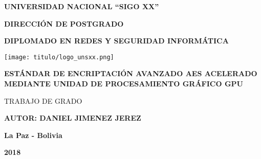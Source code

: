 \documentclass[../main.tex]{subfiles}
\begin{document}
  \thispagestyle{empty}
  \vspace*{-0.5cm}

  \begin{center}
    \LARGE\MakeUppercase{\textbf{Universidad Nacional ``Sigo XX''}}

    \vspace{0.5cm}
    \Large\MakeUppercase{\textbf{Dirección de Postgrado}}

    \vspace{0.5cm}
    \large\MakeUppercase{\textbf{Diplomado en Redes y Seguridad Informática}}

    \vspace{1.3cm}
    \texttt{[image: titulo/logo\_unsxx.png]}
    \vspace{1.3cm}

    \Large\MakeUppercase{\textbf{Estándar de Encriptación Avanzado AES acelerado mediante Unidad de Procesamiento Gráfico GPU}}

    \vspace{0.4cm}
    \large\MakeUppercase{Trabajo de Grado}

    \vspace{1cm}
    \large{\MakeUppercase{\textbf{Autor: Daniel Jimenez Jerez}}}
    \vspace{1cm}

    \large{\textbf{La Paz - Bolivia}}

    \large{\textbf{2018}}
  \end{center}
\end{document}
